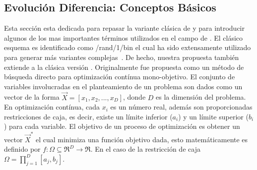\subsection{Evolución Diferencia: Conceptos Básicos}

Esta sección esta dedicada para repasar la variante clásica de \DE{} y para introducir algunos de los mas importantes términos utilizados en el campo de \DE{}.
%
El clásico esquema \DE{} es identificado como \DE{}/rand/1/bin el cual ha sido extensamente utilizado para generar más variantes complejas~\cite{das2011differential}.
%
De hecho, nuestra propuesta también extiende a la clásica versión \DE{}.
%
Originalmente \DE{} fue propuesta como un método de búsqueda directo para optimización contínua mono-objetivo.
%
El conjunto de variables involucradas en el planteamiento de un problema son dados como un vector de la forma $\vec{X} = [x_1, x_2, ..., x_D]$, donde $D$ es la dimensión del problema.
%
En optimización contínua, cada $x_i$ es un número real, además son proporcionadas restricciones de caja, es decir, existe un límite inferior ($a_{i}$) y un límite superior ($b_{i}$) para cada variable.
%
El objetivo de un proceso de optimización es obtener un vector $\vec{X}^*$ el cual minimiza una función objetivo dada, esto matemáticamente es definido por $f : \Omega \subseteq \Re^D \rightarrow \Re$.
%
En el caso de la restricción de caja $\Omega = {\prod}_{j=1}^{D} [a_{j}, b_{j}]$.

